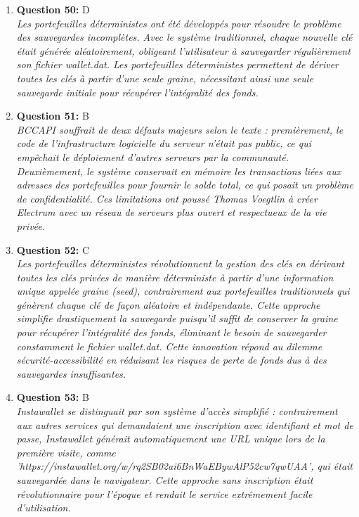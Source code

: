 \documentclass[12pt,a4paper]{article}
\begin{document}
\begin{enumerate}
\item \textbf{Question 50:} D
\\ \textit{Les portefeuilles déterministes ont été développés pour résoudre le problème des sauvegardes incomplètes. Avec le système traditionnel, chaque nouvelle clé était générée aléatoirement, obligeant l'utilisateur à sauvegarder régulièrement son fichier wallet.dat. Les portefeuilles déterministes permettent de dériver toutes les clés à partir d'une seule graine, nécessitant ainsi une seule sauvegarde initiale pour récupérer l'intégralité des fonds.}

\item \textbf{Question 51:} B
\\ \textit{BCCAPI souffrait de deux défauts majeurs selon le texte : premièrement, le code de l'infrastructure logicielle du serveur n'était pas public, ce qui empêchait le déploiement d'autres serveurs par la communauté. Deuxièmement, le système conservait en mémoire les transactions liées aux adresses des portefeuilles pour fournir le solde total, ce qui posait un problème de confidentialité. Ces limitations ont poussé Thomas Voegtlin à créer Electrum avec un réseau de serveurs plus ouvert et respectueux de la vie privée.}

\item \textbf{Question 52:} C
\\ \textit{Les portefeuilles déterministes révolutionnent la gestion des clés en dérivant toutes les clés privées de manière déterministe à partir d'une information unique appelée graine (seed), contrairement aux portefeuilles traditionnels qui génèrent chaque clé de façon aléatoire et indépendante. Cette approche simplifie drastiquement la sauvegarde puisqu'il suffit de conserver la graine pour récupérer l'intégralité des fonds, éliminant le besoin de sauvegarder constamment le fichier wallet.dat. Cette innovation répond au dilemme sécurité-accessibilité en réduisant les risques de perte de fonds dus à des sauvegardes insuffisantes.}

\item \textbf{Question 53:} B
\\ \textit{Instawallet se distinguait par son système d'accès simplifié : contrairement aux autres services qui demandaient une inscription avec identifiant et mot de passe, Instawallet générait automatiquement une URL unique lors de la première visite, comme 'https://instawallet.org/w/rq2SB02ai6BnWaEBywAlP52cw7qwUAA', qui était sauvegardée dans le navigateur. Cette approche sans inscription était révolutionnaire pour l'époque et rendait le service extrêmement facile d'utilisation.}


\end{enumerate}
\end{document}

